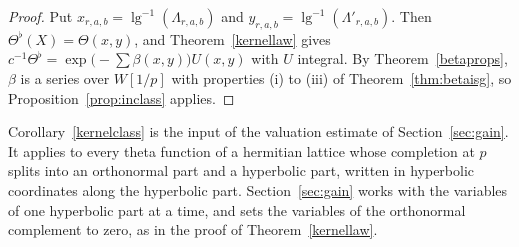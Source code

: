 \begin{proof}
Put $x_{r,a,b}=\operatorname{lg}^{-1}(\Lambda_{r,a,b})$ and $y_{r,a,b}=\operatorname{lg}^{-1}(\Lambda'_{r,a,b})$. Then $\Theta^\flat(X)=\Theta(x,y)$, and Theorem~\ref{kernellaw} gives $c^{-1}\Theta^\flat=\exp\big(-\sum\beta(x,y)\big)U(x,y)$ with $U$ integral. By Theorem~\ref{betaprops}, $\beta$ is a series over $W[1/p]$ with properties (i) to (iii) of Theorem~\ref{thm:betaisg}, so Proposition~\ref{prop:inclass} applies.
\end{proof}

Corollary~\ref{kernelclass} is the input of the valuation estimate of Section~\ref{sec:gain}. It applies to every theta function of a hermitian lattice whose completion at $p$ splits into an orthonormal part and a hyperbolic part, written in hyperbolic coordinates along the hyperbolic part. Section~\ref{sec:gain} works with the variables of one hyperbolic part at a time, and sets the variables of the orthonormal complement to zero, as in the proof of Theorem~\ref{kernellaw}.
